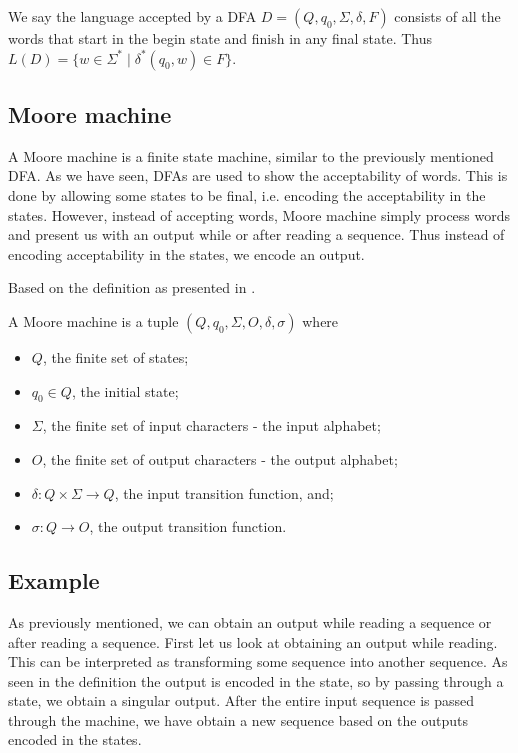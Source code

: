 \begin{definition}
We say the language accepted by a DFA $D=(Q,q_0,\Sigma,\delta,F)$ consists of all the words that start in the begin state and finish in any final state. Thus $L(D)=\{w\in\Sigma^*\mid \delta^*(q_0,w)\in F\}$.
\label{d:accepted_language}
\end{definition}


\subsection{Moore machine}
A Moore machine is a finite state machine, similar to the previously mentioned DFA. As we have seen, DFAs are used to show the acceptability of words. This is done by allowing some states to be final, i.e. encoding the acceptability in the states. However, instead of accepting words, Moore machine simply process words and present us with an output while or after reading a sequence. Thus instead of encoding acceptability in the states, we encode an output. 

Based on the definition as presented in \cite{p:moore}.
\begin{definition}
	A Moore machine is a tuple $(Q,q_0,\Sigma,O,\delta,\sigma)$ where
	\begin{itemize}
		\item $Q$, the finite set of states;
		\item $q_0\in Q$, the initial state;
		\item $\Sigma$, the finite set of input characters - the input alphabet;
		\item $O$, the finite set of output characters - the output alphabet;
		\item $\delta: Q\times \Sigma\to Q$, the input transition function, and;
		\item $\sigma : Q\to O$, the output transition function.
	\end{itemize}
\end{definition}

\subsection*{Example}
As previously mentioned, we can obtain an output while reading a sequence or after reading a sequence. First let us look at obtaining an output while reading. This can be interpreted as transforming some sequence into another sequence. As seen in the definition the output is encoded in the state, so by passing through a state, we obtain a singular output. After the entire input sequence is passed through the machine, we have obtain a new sequence based on the outputs encoded in the states.

